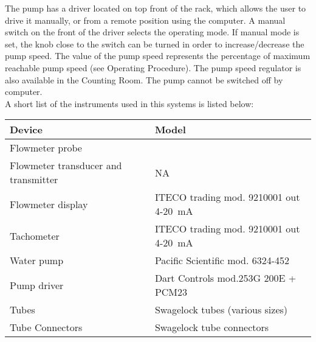 {The pump has a driver located on top front of the rack, which allows
the user to drive it manually, or from a remote position using the
computer. A manual switch on the front of the driver selects the operating
mode. If manual mode is set, the knob close to the switch can be turned
in order to increase/decrease the pump speed. The value of the pump
speed represents the percentage of maximum reachable pump speed (see
Operating Procedure). The pump speed regulator is also available in
the Counting Room. The pump cannot be switched off by computer. \\


A short list of the instruments used in this systems is listed below: 

\begin{center}\begin{tabular}{ll}
\hline 
Device &
 Model \\
\hline
Flowmeter probe &
 \\
 Flowmeter transducer and transmitter &
 NA\\
 Flowmeter display &
 ITECO trading mod. 9210001 out 4-20~mA \\
 Tachometer &
 ITECO trading mod. 9210001 out 4-20~mA \\
 Water pump &
 Pacific Scientific mod. 6324-452 \\
 Pump driver &
 Dart Controls mod.253G 200E + PCM23 \\
 Tubes &
 Swagelock tubes (various sizes) \\
 Tube Connectors &
 Swagelock tube connectors  \\
\hline
\end{tabular}\end{center}

}

